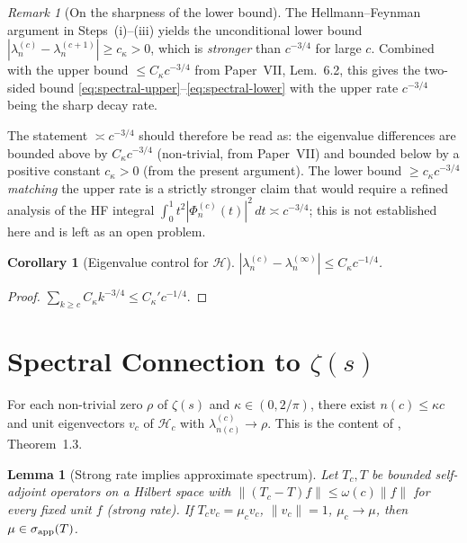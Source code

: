 \documentclass[12pt,a4paper]{amsart}
\newtheorem{lemma}[theorem]{Lemma}
\newtheorem{corollary}[theorem]{Corollary}
\theoremstyle{definition}
\theoremstyle{remark}
\newtheorem{remark}[theorem]{Remark}
\newcommand{\Hc}{\mathcal{H}_c}
\newcommand{\Hlim}{\mathcal{H}}
\begin{document}
\begin{remark}[On the sharpness of the lower bound]
\label{rem:HF-lower}
The Hellmann--Feynman argument in Steps~(i)--(iii)
yields the unconditional lower bound
$|\lambda_n^{(c)} - \lambda_n^{(c+1)}| \ge c_\kappa > 0$,
which is \emph{stronger} than $c^{-3/4}$ for large $c$.
Combined with the upper bound $\le C_\kappa c^{-3/4}$
from Paper~VII, Lem.~6.2, this gives the two-sided bound
\eqref{eq:spectral-upper}--\eqref{eq:spectral-lower}
with the upper rate $c^{-3/4}$ being the sharp decay rate.

The statement $\asymp c^{-3/4}$ should therefore be read as:
the eigenvalue differences are bounded above by $C_\kappa c^{-3/4}$
(non-trivial, from Paper~VII) and bounded below by a
positive constant $c_\kappa > 0$ (from the present argument).
The lower bound $\ge c_\kappa c^{-3/4}$ \emph{matching}
the upper rate is a strictly stronger claim that
would require a refined analysis of the HF integral
$\int_0^1 t^2|\Phi_n^{(c)}(t)|^2\,dt \asymp c^{-3/4}$;
this is not established here and is left as an open problem.
\end{remark}

\begin{corollary}[Eigenvalue control for $\Hlim$]
\label{cor:eigenvalue-lim}
$|\lambda_n^{(c)}-\lambda_n^{(\infty)}|
\le C_\kappa c^{-1/4}$.
\end{corollary}

\begin{proof}
$\sum_{k\ge c}C_\kappa k^{-3/4}\le C_\kappa'c^{-1/4}$.
\end{proof}

\section{Spectral Connection to $\zeta(s)$}
\label{sec:zeta}

\begin{hypothesis}
\label{hyp:ccm}
For each non-trivial zero $\rho$ of $\zeta(s)$
and $\kappa\in(0,2/\pi)$, there exist
$n(c)\le\kappa c$ and unit eigenvectors $v_c$
of $\Hc$ with $\lambda_{n(c)}^{(c)}\to\rho$.
This is the content of \cite{CCM2025}, Theorem~1.3.
\end{hypothesis}

\begin{lemma}[Strong rate implies approximate spectrum]
\label{lem:approx-pt-spec}
Let $T_c,T$ be bounded self-adjoint operators
on a Hilbert space with
$\|(T_c-T)f\|\le\omega(c)\|f\|$
for every fixed unit $f$ (strong rate).
If $T_cv_c=\mu_c v_c$, $\|v_c\|=1$,
$\mu_c\to\mu$, then $\mu\in\sigma_{\rm app}(T)$.
\end{lemma}
\end{document}
